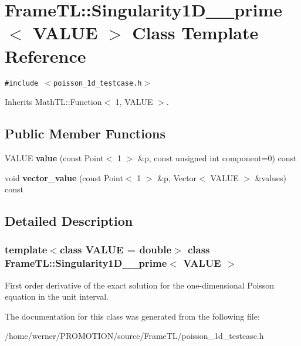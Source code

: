 \hypertarget{classFrameTL_1_1Singularity1D__2__prime}{
\section{FrameTL::Singularity1D\_\_\-prime$<$ VALUE $>$ Class Template Reference}
\label{classFrameTL_1_1Singularity1D__2__prime}
}
{\tt \#include $<$poisson\_\-1d\_\-testcase.h$>$}

Inherits MathTL::Function$<$ 1, VALUE $>$.

\subsection*{Public Member Functions}
\begin{CompactItemize}
\item 
\hypertarget{classFrameTL_1_1Singularity1D__2__prime_d8365aa295f2a9048f1b109abc070922}{
VALUE \textbf{value} (const Point$<$ 1 $>$ \&p, const unsigned int component=0) const }
\label{classFrameTL_1_1Singularity1D__2__prime_d8365aa295f2a9048f1b109abc070922}

\item 
\hypertarget{classFrameTL_1_1Singularity1D__2__prime_3c07f533d6ce2558d92c10e07470b2ab}{
void \textbf{vector\_\-value} (const Point$<$ 1 $>$ \&p, Vector$<$ VALUE $>$ \&values) const }
\label{classFrameTL_1_1Singularity1D__2__prime_3c07f533d6ce2558d92c10e07470b2ab}

\end{CompactItemize}


\subsection{Detailed Description}
\subsubsection*{template$<$class VALUE = double$>$ class FrameTL::Singularity1D\_\_\-prime$<$ VALUE $>$}

First order derivative of the exact solution for the one-dimensional Poisson equation in the unit interval. 

The documentation for this class was generated from the following file:\begin{CompactItemize}
\item 
/home/werner/PROMOTION/source/FrameTL/poisson\_\-1d\_\-testcase.h\end{CompactItemize}
